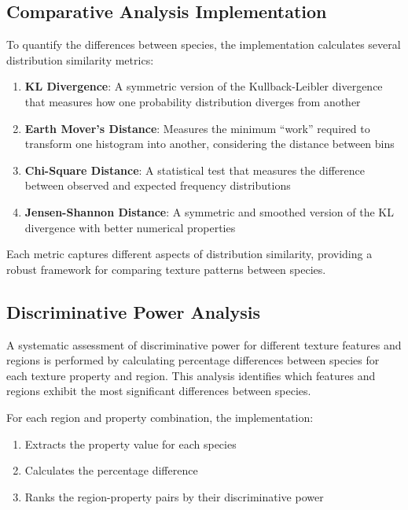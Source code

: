 \documentclass[a4paper,12pt]{report}
\begin{document}
\subsection{Comparative Analysis Implementation}

To quantify the differences between species, the implementation calculates several distribution similarity metrics:

\begin{enumerate}
    \item \textbf{KL Divergence}: A symmetric version of the Kullback-Leibler divergence that measures how one probability distribution diverges from another

    \item \textbf{Earth Mover's Distance}: Measures the minimum ``work'' required to transform one histogram into another, considering the distance between bins

    \item \textbf{Chi-Square Distance}: A statistical test that measures the difference between observed and expected frequency distributions

    \item \textbf{Jensen-Shannon Distance}: A symmetric and smoothed version of the KL divergence with better numerical properties
\end{enumerate}

Each metric captures different aspects of distribution similarity, providing a robust framework for comparing texture patterns between species.

\subsection{Discriminative Power Analysis}

A systematic assessment of discriminative power for different texture features and regions is performed by calculating percentage differences between species for each texture property and region. This analysis identifies which features and regions exhibit the most significant differences between species.

For each region and property combination, the implementation:
\begin{enumerate}
    \item Extracts the property value for each species
    \item Calculates the percentage difference
    \item Ranks the region-property pairs by their discriminative power
\end{enumerate}
\end{document}
